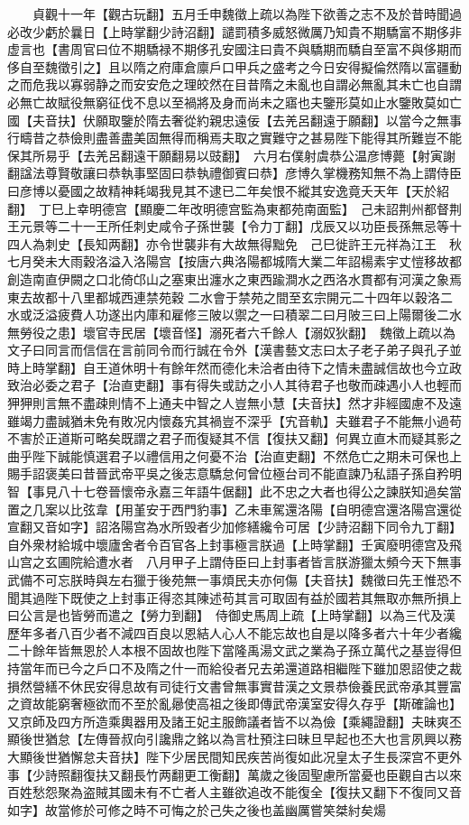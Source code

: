 　　貞觀十一年【觀古玩翻】五月壬申魏徵上疏以為陛下欲善之志不及於昔時聞過必改少虧於曩日【上時掌翻少詩沼翻】譴罰積多威怒微厲乃知貴不期驕富不期侈非虚言也【書周官曰位不期驕禄不期侈孔安國注曰貴不與驕期而驕自至富不與侈期而侈自至魏徵引之】且以隋之府庫倉廪戶口甲兵之盛考之今日安得擬倫然隋以富疆動之而危我以寡弱静之而安安危之理皎然在目昔隋之未亂也自謂必無亂其未亡也自謂必無亡故賦役無窮征伐不息以至禍將及身而尚未之寤也夫鑒形莫如止水鑒敗莫如亡國【夫音扶】伏願取鑒於隋去奢從約親忠遠佞【去羌呂翻遠于願翻】以當今之無事行疇昔之恭儉則盡善盡美固無得而稱焉夫取之實難守之甚易陛下能得其所難豈不能保其所易乎【去羌呂翻遠干願翻易以豉翻】　六月右僕射虞恭公温彦博薨【射寅謝翻諡法尊賢敬讓曰恭執事堅固曰恭執禮御賓曰恭】彦博久掌機務知無不為上謂侍臣曰彦博以憂國之故精神耗竭我見其不逮已二年矣恨不縱其安逸竟夭天年【天於紹翻】　丁巳上幸明德宫【顯慶二年改明德宫監為東都苑南面監】　己未詔荆州都督荆王元景等二十一王所任刺史咸令子孫世襲【令力丁翻】戊辰又以功臣長孫無忌等十四人為刺史【長知两翻】亦令世襲非有大故無得黜免　己巳徙許王元祥為江王　秋七月癸未大雨穀洛溢入洛陽宫【按唐六典洛陽都城隋大業二年詔楊素宇丈愷移故都創造南直伊闕之口北倚邙山之塞東出瀍水之東西踰澗水之西洛水貫都有河漢之象焉東去故都十八里都城西連禁苑穀二水會于禁苑之間至玄宗開元二十四年以穀洛二水或泛溢疲費人功遂出内庫和雇修三陂以禦之一曰積翠二曰月陂三曰上陽爾後二水無勞役之患】壞官寺民居【壞音怪】溺死者六千餘人【溺奴狄翻】　魏徵上疏以為文子曰同言而信信在言前同令而行誠在令外【漢書藝文志曰太子老子弟子與孔子並時上時掌翻】自王道休明十有餘年然而德化未洽者由待下之情未盡誠信故也今立政致治必委之君子【治直吏翻】事有得失或訪之小人其待君子也敬而疎遇小人也輕而狎狎則言無不盡疎則情不上通夫中智之人豈無小慧【夫音扶】然才非經國慮不及遠雖竭力盡誠猶未免有敗况内懷姦宄其禍豈不深乎【宄音軌】夫雖君子不能無小過苟不害於正道斯可略矣既謂之君子而復疑其不信【復扶又翻】何異立直木而疑其影之曲乎陛下誠能慎選君子以禮信用之何憂不治【治直吏翻】不然危亡之期未可保也上賜手詔褒美曰昔晉武帝平吳之後志意驕怠何曾位極台司不能直諫乃私語子孫自矜明智【事見八十七卷晉懷帝永嘉三年語牛倨翻】此不忠之大者也得公之諫朕知過矣當置之几案以比弦韋【用堇安于西門豹事】乙未車駕還洛陽【自明德宫還洛陽宫還從宣翻又音如字】詔洛陽宫為水所毁者少加修繕纔令可居【少詩沼翻下同令九丁翻】自外衆材給城中壞廬舍者令百官各上封事極言朕過【上時掌翻】壬寅廢明德宫及飛山宫之玄圃院給遭水者　八月甲子上謂侍臣曰上封事者皆言朕游獵太頻今天下無事武備不可忘朕時與左右獵于後苑無一事煩民夫亦何傷【夫音扶】魏徵曰先王惟恐不聞其過陛下既使之上封事正得恣其陳述苟其言可取固有益於國若其無取亦無所損上曰公言是也皆勞而遣之【勞力到翻】　侍御史馬周上疏【上時掌翻】以為三代及漢歷年多者八百少者不減四百良以恩結人心人不能忘故也自是以降多者六十年少者纔二十餘年皆無恩於人本根不固故也陛下當隆禹湯文武之業為子孫立萬代之基豈得但持當年而已今之戶口不及隋之什一而給役者兄去弟還道路相繼陛下雖加恩詔使之裁損然營繕不休民安得息故有司徒行文書曾無事實昔漢之文景恭儉養民武帝承其豐富之資故能窮奢極欲而不至於亂曏使高祖之後即傳武帝漢室安得久存乎【斯確論也】又京師及四方所造乘輿器用及諸王妃主服飾議者皆不以為儉【乘繩證翻】夫昧爽丕顯後世猶怠【左傳晉叔向引讒鼎之銘以為言杜預注曰昧旦早起也丕大也言夙興以務大顯後世猶懈怠夫音扶】陛下少居民間知民疾苦尚復如此况皇太子生長深宫不更外事【少詩照翻復扶又翻長竹两翻更工衡翻】萬歲之後固聖慮所當憂也臣觀自古以來百姓愁怨聚為盗賊其國未有不亡者人主雖欲追改不能復全【復扶又翻下不復同又音如字】故當修於可修之時不可悔之於己失之後也盖幽厲嘗笑桀紂矣煬